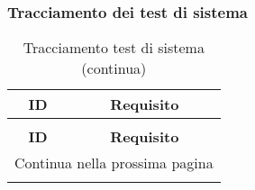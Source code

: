 \clearpage
\subsubsection{Tracciamento dei test di sistema}

\bgroup
\begin{adjustwidth}{-0.5cm}{-0.5cm}
	\centering
  \begin{longtable}{|c|c|}
		\caption{Tracciamento test di sistema}
  	\label{tab:tracciamento-test-sistema} \\
    \hline
		\textbf{ID} & \textbf{Requisito} \\ 
		\hline
		\endfirsthead

		\caption[]{Tracciamento test di sistema (continua)} \\
		\hline
		\textbf{ID} & \textbf{Requisito} \\ 
		\hline
		\endhead

		\hline
		\multicolumn{2}{|r|}{{Continua nella prossima pagina}} \\ 
		\hline
		\endfoot

		\hline
		\endlastfoot


\end{longtable}
\end{adjustwidth}
